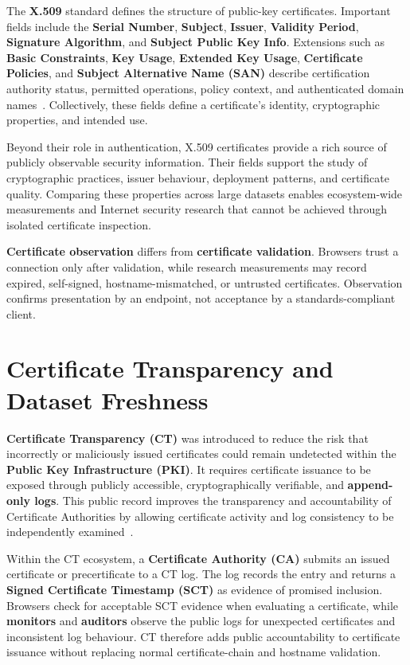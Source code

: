 The \textbf{X.509} standard defines the structure of public-key certificates.
Important fields include the \textbf{Serial Number}, \textbf{Subject},
\textbf{Issuer}, \textbf{Validity Period}, \textbf{Signature Algorithm}, and
\textbf{Subject Public Key Info}. Extensions such as
\textbf{Basic Constraints}, \textbf{Key Usage}, \textbf{Extended Key Usage},
\textbf{Certificate Policies}, and \textbf{Subject Alternative Name (SAN)}
describe certification authority status, permitted operations, policy context,
and authenticated domain names~\cite{rfc5280}. Collectively, these fields define
a certificate's identity, cryptographic properties, and intended use.

Beyond their role in authentication, X.509 certificates provide a rich source 
of publicly observable security information. Their fields support the study of 
cryptographic practices, issuer behaviour, deployment patterns, and certificate 
quality. Comparing these properties across large datasets enables ecosystem-wide measurements and
Internet security research that cannot be achieved through isolated
certificate inspection.

\textbf{Certificate observation} differs from \textbf{certificate validation}.
Browsers trust a connection only after validation, while research measurements
may record expired, self-signed, hostname-mismatched, or untrusted
certificates. Observation confirms presentation by an endpoint, not acceptance
by a standards-compliant client.

\section{Certificate Transparency and Dataset Freshness}
\label{sec:ct-freshness}

\textbf{Certificate Transparency (CT)} was introduced to reduce the risk that
incorrectly or maliciously issued certificates could remain undetected within
the \textbf{Public Key Infrastructure (PKI)}. It requires certificate issuance
to be exposed through publicly accessible, cryptographically verifiable, and
\textbf{append-only logs}. This public record improves the transparency and
accountability of Certificate Authorities by allowing certificate activity and
log consistency to be independently examined~\cite{rfc9162}.

Within the CT ecosystem, a \textbf{Certificate Authority (CA)} submits an
issued certificate or precertificate to a CT log. The log records the entry and
returns a \textbf{Signed Certificate Timestamp (SCT)} as evidence of promised
inclusion. Browsers check for acceptable SCT evidence when evaluating a
certificate, while \textbf{monitors} and \textbf{auditors} observe the public
logs for unexpected certificates and inconsistent log behaviour. CT therefore
adds public accountability to certificate issuance without replacing normal
certificate-chain and hostname validation.

